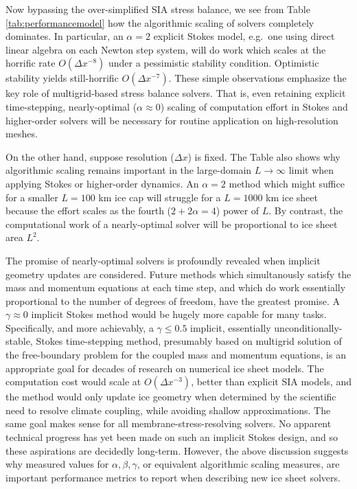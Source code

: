 \documentclass[twocolumn,letterpaper]{igs}
\begin{document}
Now bypassing the over-simplified SIA stress balance, we see from Table \ref{tab:performancemodel} how the algorithmic scaling of solvers completely dominates.  In particular, an $\alpha=2$ explicit Stokes model, e.g.~one using direct linear algebra on each Newton step system, will do work which scales at the horrific rate $O(\Delta x^{-8})$ under a pessimistic stability condition.  Optimistic stability yields still-horrific $O(\Delta x^{-7})$.  These simple observations emphasize the key role of multigrid-based stress balance solvers.  That is, even retaining explicit time-stepping, nearly-optimal ($\alpha \approx 0$) scaling of computation effort in Stokes and higher-order solvers will be necessary for routine application on high-resolution meshes.

On the other hand, suppose resolution ($\Delta x$) is fixed.  The Table also shows why algorithmic scaling remains important in the large-domain $L\to\infty$ limit when applying Stokes or higher-order dynamics.  An $\alpha=2$ method which might suffice for a smaller $L=100$ km ice cap will struggle for a $L=1000$ km ice sheet because the effort scales as the fourth ($2+2\alpha=4$) power of $L$.  By contrast, the computational work of a nearly-optimal solver will be proportional to ice sheet area $L^2$.

The promise of nearly-optimal solvers is profoundly revealed when implicit geometry updates are considered.  Future methods which simultanously satisfy the mass and momentum equations at each time step, and which do work essentially proportional to the number of degrees of freedom, have the greatest promise.  A $\gamma \approx 0$ implicit Stokes method would be hugely more capable for many tasks.  Specifically, and more achievably, a $\gamma \le 0.5$ implicit, essentially unconditionally-stable, Stokes time-stepping method, presumably based on multigrid solution of the free-boundary problem for the coupled mass and momentum equations, is an appropriate goal for decades of research on numerical ice sheet models.  The computation cost would scale at $O(\Delta x^{-3})$, better than explicit SIA models, and the method would only update ice geometry when determined by the scientific need to resolve climate coupling, while avoiding shallow approximations.  The same goal makes sense for all membrane-stress-resolving solvers.  No apparent technical progress has yet been made on such an implicit Stokes design, and so these aspirations are decidedly long-term.  However, the above discussion suggests why measured values for $\alpha,\beta,\gamma$, or equivalent algorithmic scaling measures, are important performance metrics to report when describing new ice sheet solvers.



\end{document}
